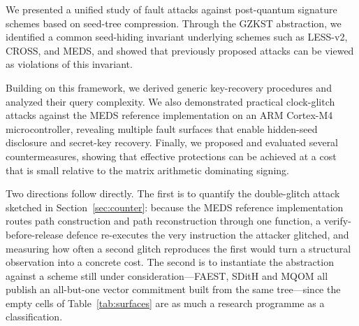We presented a unified study of fault attacks against 
post-quantum signature schemes based on seed-tree compression. 
Through the GZKST abstraction, we identified a 
common seed-hiding invariant underlying schemes such as 
LESS-v2, CROSS, and MEDS, and showed that previously 
proposed attacks can be viewed as violations of this 
invariant.

Building on this framework, we derived generic key-recovery 
procedures and analyzed their query complexity. We also 
demonstrated practical clock-glitch attacks against the 
MEDS reference implementation on an ARM Cortex-M4 
microcontroller, revealing multiple fault surfaces that 
enable hidden-seed disclosure and secret-key recovery. 
Finally, we proposed and evaluated several countermeasures, showing that
effective protections can be achieved at a cost that is small relative to the
matrix arithmetic dominating signing.

Two directions follow directly. The first is to quantify the double-glitch
attack sketched in Section~\ref{sec:counter}: because the MEDS reference
implementation routes path construction and path reconstruction through one
function, a verify-before-release defence re-executes the very instruction the
attacker glitched, and measuring how often a second glitch reproduces the
first would turn a structural observation into a concrete cost. The second is
to instantiate the abstraction against a scheme still under
consideration---FAEST, SDitH and MQOM all publish an all-but-one vector
commitment built from the same tree---since the empty cells of
Table~\ref{tab:surfaces} are as much a research programme as a
classification.